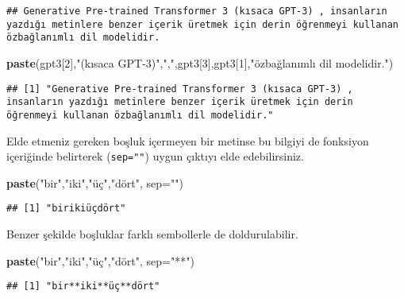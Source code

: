 \documentclass[
]{book}
\newenvironment{Shaded}{\begin{snugshade}}{\end{snugshade}}
\newcommand{\DataTypeTok}[1]{\textcolor[rgb]{0.13,0.29,0.53}{#1}}
\newcommand{\DecValTok}[1]{\textcolor[rgb]{0.00,0.00,0.81}{#1}}
\newcommand{\KeywordTok}[1]{\textcolor[rgb]{0.13,0.29,0.53}{\textbf{#1}}}
\newcommand{\NormalTok}[1]{#1}
\newcommand{\StringTok}[1]{\textcolor[rgb]{0.31,0.60,0.02}{#1}}
\begin{document}
\begin{verbatim}
## Generative Pre-trained Transformer 3 (kısaca GPT-3) , insanların yazdığı metinlere benzer içerik üretmek için derin öğrenmeyi kullanan özbağlanımlı dil modelidir.
\end{verbatim}

\begin{Shaded}
\begin{Highlighting}[]
\KeywordTok{paste}\NormalTok{(gpt3[}\DecValTok{2}\NormalTok{],}\StringTok{"(kısaca GPT-3)"}\NormalTok{,}\StringTok{","}\NormalTok{,gpt3[}\DecValTok{3}\NormalTok{],gpt3[}\DecValTok{1}\NormalTok{],}\StringTok{"özbağlanımlı dil modelidir."}\NormalTok{)}
\end{Highlighting}
\end{Shaded}

\begin{verbatim}
## [1] "Generative Pre-trained Transformer 3 (kısaca GPT-3) , insanların yazdığı metinlere benzer içerik üretmek için derin öğrenmeyi kullanan özbağlanımlı dil modelidir."
\end{verbatim}

Elde etmeniz gereken boşluk içermeyen bir metinse bu bilgiyi de fonksiyon içeriğinde belirterek (\texttt{sep=""}) uygun çıktıyı elde edebilirsiniz.

\begin{Shaded}
\begin{Highlighting}[]
\KeywordTok{paste}\NormalTok{(}\StringTok{"bir"}\NormalTok{,}\StringTok{"iki"}\NormalTok{,}\StringTok{"üç"}\NormalTok{,}\StringTok{"dört"}\NormalTok{, }\DataTypeTok{sep=}\StringTok{""}\NormalTok{)}
\end{Highlighting}
\end{Shaded}

\begin{verbatim}
## [1] "birikiüçdört"
\end{verbatim}

Benzer şekilde boşluklar farklı sembollerle de doldurulabilir.

\begin{Shaded}
\begin{Highlighting}[]
\KeywordTok{paste}\NormalTok{(}\StringTok{"bir"}\NormalTok{,}\StringTok{"iki"}\NormalTok{,}\StringTok{"üç"}\NormalTok{,}\StringTok{"dört"}\NormalTok{, }\DataTypeTok{sep=}\StringTok{"**"}\NormalTok{)}
\end{Highlighting}
\end{Shaded}

\begin{verbatim}
## [1] "bir**iki**üç**dört"
\end{verbatim}
\end{document}
